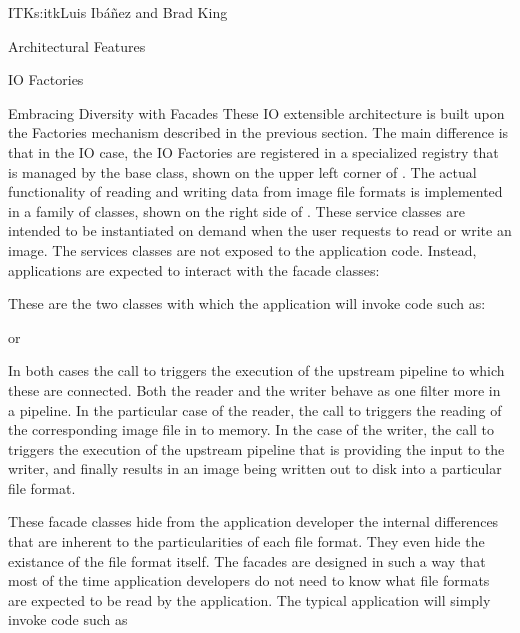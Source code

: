 \begin{aosachapter}{ITK}{s:itk}{Luis Ib\'{a}\~{n}ez and Brad King}
\begin{aosasect1}{Architectural Features}
\begin{aosasect2}{IO Factories}
\begin{aosasect3}{Embracing Diversity with Facades}
These IO extensible architecture is built upon the Factories mechanism
described in the previous section. The main difference is that in the IO case,
the IO Factories are registered in a specialized registry that is managed by
the  base class, shown on the upper left corner of
. The actual functionality of reading
and writing data from image file formats is implemented in a family of
 classes, shown on the right side of
. These service classes are intended
to be instantiated on demand when the user requests to read or write an image.
The services classes are not exposed to the application code. Instead,
applications are expected to interact with the facade classes:

\begin{aosaitemize}
\item {}
\item {}
\end{aosaitemize}

These are the two classes with which the application will invoke code such as:

\begin{aosaitemize}
\item {}
\item {}
\end{aosaitemize}

or

\begin{aosaitemize}
\item {}
\item {}
\end{aosaitemize}

In both cases the call to  triggers the execution of the
upstream pipeline to which these  are connected. Both the
reader and the writer behave as one filter more in a pipeline. In the
particular case of the reader, the call to  triggers the reading
of the corresponding image file in to memory. In the case of the writer, the
call to  triggers the execution of the upstream pipeline that is
providing the input to the writer, and finally results in an image being
written out to disk into a particular file format.

These facade classes hide from the application developer the
internal differences that are inherent to the particularities of
each file format. They even hide the existance of the file format
itself. The facades are designed in such a way that most of the
time application developers do not need to know what file formats
are expected to be read by the application. The typical
application will simply invoke code such as


\end{aosasect3}
\end{aosasect2}
\end{aosasect1}
\end{aosachapter}
